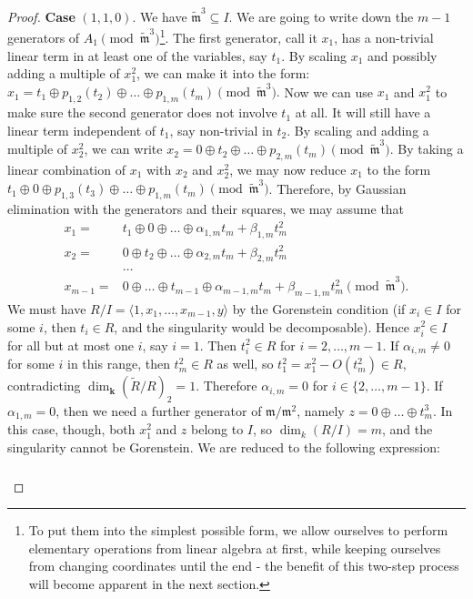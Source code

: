 \documentclass[11pt]{amsart}
\renewcommand{\k}{\mathbf k}
\newcommand{\m}{\mathfrak m}
\newcommand{\tR}{\widetilde{R}}
\newcommand{\tm}{\widetilde{\mathfrak m}}
\theoremstyle{plain}
\theoremstyle{definition}
\begin{document}
\begin{proof}
 \textbf{Case} $(1,1,0)$. We have $\tm^3\subseteq I$. We are going to write down the $m-1$ generators of $A_1 \pmod {\tm^3}$\footnote{To put them into the simplest possible form, we allow ourselves to perform elementary operations from linear algebra at first, while keeping ourselves from changing coordinates until the end - the benefit of this two-step process will become apparent in the next section.}. The first generator, call it $x_1$, has a non-trivial linear term in at least one of the variables, say $t_1$. By scaling $x_1$ and possibly adding a multiple of $x_1^2$, we can make it into the form:
 $x_1=t_1\oplus p_{1,2}(t_2)\oplus\ldots\oplus p_{1,m}(t_m) \pmod{\tm^3}.$ Now we can use $x_1$ and $x_1^2$ to make sure the second generator does not involve $t_1$ at all. It will still have a linear term independent of $t_1$, say non-trivial in $t_2$. By scaling and adding a multiple of $x_2^2$, we can write $x_2=0\oplus t_2\oplus\ldots\oplus p_{2,m}(t_m) \pmod{\tm^3}.$ By taking a linear combination of $x_1$ with $x_2$ and $x_2^2$, we may now reduce $x_1$ to the form $t_1\oplus0\oplus p_{1,3}(t_3)\oplus\ldots\oplus p_{1,m}(t_m)\pmod{\tm^3}$. Therefore, by Gaussian elimination with the generators and their squares, we may assume that
 \begin{align*}
  x_1= & t_1\oplus0\oplus\ldots\oplus\alpha_{1,m}t_m+\beta_{1,m}t_m^2\\
  x_2= & 0\oplus t_2\oplus\ldots\oplus\alpha_{2,m}t_m+\beta_{2,m}t_m^2\\
  &\ldots\\
  x_{m-1}= & 0\oplus\ldots\oplus t_{m-1}\oplus\alpha_{m-1,m}t_m+\beta_{m-1,m}t_m^2 \pmod{\tm^3}.
 \end{align*}
 We must have $R/I=\langle 1,x_1,\ldots,x_{m-1},y\rangle$ by the Gorenstein condition (if $x_i\in I$ for some $i$, then $t_i\in R$, and the singularity would be decomposable). Hence $x_i^2\in I$ for all but at most one $i$, say $i=1$. Then $t_i^2\in R$ for $i=2,\ldots,m-1$. If $\alpha_{i,m}\neq 0$ for some $i$ in this range, then $t_m^2\in R$ as well, so $t_1^2=x_1^2-O(t_m^2)\in R$, contradicting $\dim_\k(\tR/R)_2=1$. Therefore $\alpha_{i,m}=0$ for $i\in\{2,\ldots,m-1\}$. If $\alpha_{1,m}=0$, then we need a further generator of $\m/\m^2$, namely $z=0\oplus\ldots\oplus t_m^3$. In this case, though, both $x_1^2$ and $z$ belong to $I$, so $\dim_k(R/I)=m$, and the singularity cannot be Gorenstein. We are reduced to the following expression:
 \begin{align}\label{coordII-cs}
 \begin{split}

\end{split}
\end{align}
\end{proof}
\end{document}
